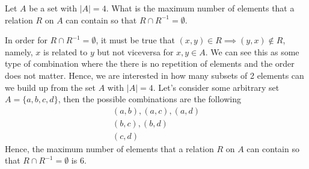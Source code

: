 \documentclass[12pt]{article}
\newenvironment{problem}[2][Problem]{\begin{trivlist}
		\item[\hskip \labelsep {\bfseries #1}\hskip \labelsep {\bfseries #2.}]}{\end{trivlist}}
\newenvironment{solution}[2][Solution]{\begin{trivlist}
		\item[\hskip \labelsep {\bfseries #1}\hskip \labelsep {\bfseries #2.}]}{\end{trivlist}}
\begin{document}
	\begin{problem}{10}
	Let $A$ be a set with $|A|=4$. What is the maximum number of elements that a relation $R$ on $A$ can contain so that $R\cap R^{-1}=\emptyset$.
	\begin{solution}{10}
		In order for $R\cap R^{-1} = \emptyset$, it must be true that $(x,y)\in R\implies (y,x)\not\in R$, namely, $x$ is related to $y$ but not viceversa for $x,y \in A$. We can see this as some type of combination where the there is no repetition of elements and the order does not matter. Hence, we are interested in how many subsets of 2 elements can we build up from the set $A$ with $|A|=4$. Let's consider some arbitrary set $A=\{a,b,c,d\}$, then the possible combinations are the following
		\begin{align*}
			(a,b), (a,c), (a,d)\\
			(b,c), (b,d)\\
			(c,d)
		\end{align*}
		Hence, the maximum number of elements that a relation $R$ on $A$ can contain so that $R\cap R^{-1}=\emptyset$ is 6.
	\end{solution} 
	\end{problem}
\end{document}
